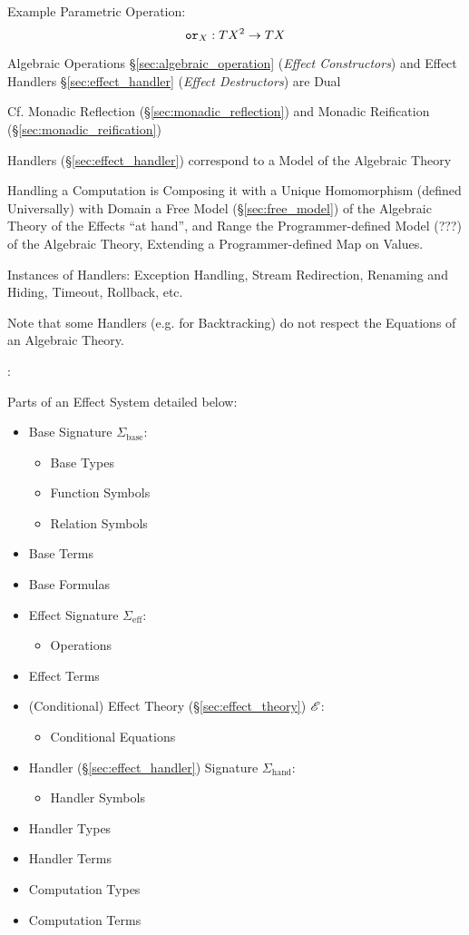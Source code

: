 Example Parametric Operation:
\[
  \mathtt{or}_X : T X^2 \rightarrow T X
\]

Algebraic Operations \S\ref{sec:algebraic_operation} (\emph{Effect
  Constructors}) and Effect Handlers \S\ref{sec:effect_handler}
(\emph{Effect Destructors}) are Dual

\fist Cf. Monadic Reflection (\S\ref{sec:monadic_reflection})
and Monadic Reification (\S\ref{sec:monadic_reification})

Handlers (\S\ref{sec:effect_handler}) correspond to a Model of the
Algebraic Theory

Handling a Computation is Composing it with a Unique Homomorphism
(defined Universally) with Domain a Free Model
(\S\ref{sec:free_model}) of the Algebraic Theory of the Effects ``at
hand'', and Range the Programmer-defined Model (???) of the Algebraic
Theory, Extending a Programmer-defined Map on Values.

Instances of Handlers: Exception Handling, Stream Redirection,
Renaming and Hiding, Timeout, Rollback, etc.

\fist Note that some Handlers (e.g. for Backtracking) do not
respect the Equations of an Algebraic Theory. \cite{pretnar15}

\cite{plotkin-pretnar09}:

Parts of an Effect System detailed below:
\begin{itemize}
  \item Base Signature $\Sigma_\mathrm{base}$:
    \begin{itemize}
      \item Base Types
      \item Function Symbols
      \item Relation Symbols
    \end{itemize}
  \item Base Terms
  \item Base Formulas
  \item Effect Signature $\Sigma_\mathrm{eff}$:
    \begin{itemize}
      \item Operations
    \end{itemize}
  \item Effect Terms
  \item (Conditional) Effect Theory (\S\ref{sec:effect_theory})
    $\mathscr{E}$:
    \begin{itemize}
      \item Conditional Equations
    \end{itemize}
  \item Handler (\S\ref{sec:effect_handler}) Signature
    $\Sigma_\mathrm{hand}$:
    \begin{itemize}
      \item Handler Symbols
    \end{itemize}
  \item Handler Types
  \item Handler Terms
  \item Computation Types
  \item Computation Terms
\end{itemize}


